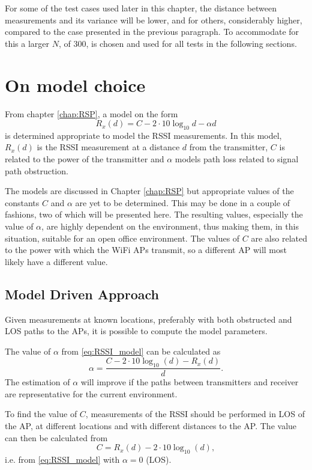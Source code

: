\documentclass{LTHthesis}
\begin{document}
For some of the test cases used later in this chapter, the distance between measurements and its variance will be lower, and for others, considerably higher, compared to the case presented in the previous paragraph. To accommodate for this a larger $N$, of 300, is chosen and used for all tests in the following sections.    
%
\section{On model choice}
%
From chapter \ref{chap:RSP}, a model on the form
%
\begin{equation}
R_x(d) = C - 2\cdot10\log_{10}{d}-\alpha d
\label{eq:RSSI_model}
\end{equation}
%
is determined appropriate to model the RSSI measurements. In this model, $R_x(d)$ is the RSSI measurement at a distance $d$ from the transmitter, $C$ is related to the power of the transmitter and $\alpha$ models path loss related to signal path obstruction. 

The models are discussed in Chapter \ref{chap:RSP} but appropriate values of the constants $C$ and $\alpha$ are yet to be determined. This may be done in a couple of fashions, two of which will be presented here. The resulting values, especially the value of $\alpha$, are highly dependent on the environment, thus making them, in this situation, suitable for an open office environment. The values of $C$ are also related to the power with which the WiFi APs transmit, so a different AP will most likely have a different value.      

\subsection{Model Driven Approach}
%
Given measurements at known locations, preferably with both obstructed and LOS paths to the APs, it is possible to compute the model parameters.

The value of $\alpha$ from \ref{eq:RSSI_model} can be calculated as
%
\begin{equation}
\alpha = \frac{C-2\cdot10\log_{10}(d)-R_x(d)}{d}.
\end{equation}
%
The estimation of $\alpha$ will improve if the paths between transmitters and receiver are representative for the current environment.  

To find the value of $C$, measurements of the RSSI should be performed in LOS of the AP, at different locations and with different distances to the AP. The value can then be calculated from
%
\begin{equation}
C=R_x(d) - 2\cdot10\log_{10}(d),
\end{equation}
% 
i.e. from \ref{eq:RSSI_model} with $\alpha = 0$ (LOS).
\end{document}
